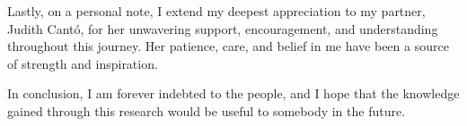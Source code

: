 \begin{Acknowledgements}
	Lastly, on a personal note, I extend my deepest appreciation to my partner, Judith Cantó, for her unwavering support, encouragement, and understanding throughout this journey. Her patience, care, and belief in me have been a source of strength and inspiration.
	
	In conclusion, I am forever indebted to the people, and I hope that the knowledge gained through this research would be useful to somebody in the future.
	
	
	
	
	
	
	
	
	
	
	
	
	
	
	
	
	
	
	
	
\end{Acknowledgements}
\cleardoublepage